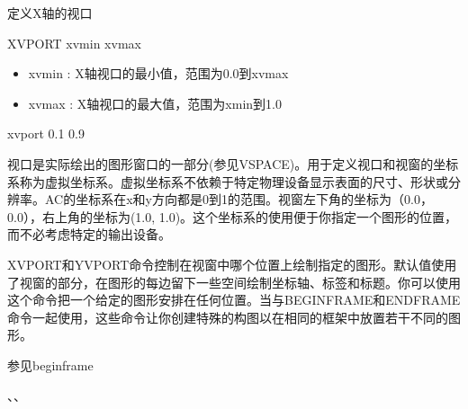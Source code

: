 \label{cmd:xvport}

定义X轴的视口

\begin{SACSTX}
XVPORT xvmin xvmax
\end{SACSTX}

\begin{itemize}
\item xvmin : X轴视口的最小值，范围为0.0到xvmax 
\item xvmax : X轴视口的最大值，范围为xmin到1.0 
\end{itemize}

\begin{SACDFT}
xvport 0.1 0.9
\end{SACDFT}

视口是实际绘出的图形窗口的一部分(参见VSPACE)。用于定义视口和视窗的坐标系称为虚拟坐标系。虚拟坐标系不依赖于特定物理设备显示表面的尺寸、形状或分辨率。AC的坐标系在x和y方向都是0到1的范围。视窗左下角的坐标为（0.0，0.0），右上角的坐标为(1.0, 1.0)。这个坐标系的使用便于你指定一个图形的位置，而不必考虑特定的输出设备。

XVPORT和YVPORT命令控制在视窗中哪个位置上绘制指定的图形。默认值使用了视窗的部分，在图形的每边留下一些空间绘制坐标轴、标签和标题。你可以使用这个命令把一个给定的图形安排在任何位置。当与BEGINFRAME和ENDFRAME命令一起使用，这些命令让你创建特殊的构图以在相同的框架中放置若干不同的图形。

参见beginframe

、、
